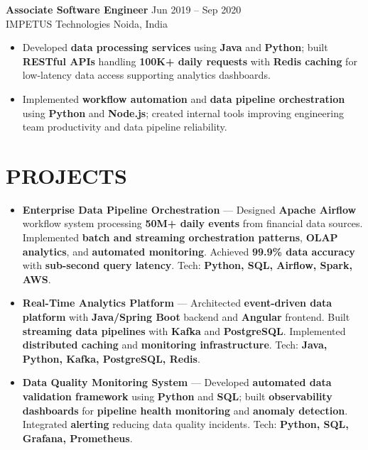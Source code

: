 \documentclass[letterpaper,10pt]{article}
\newcommand{\resumeItem}[1]{\item\small #1}
\newcommand{\resumeSubheading}[4]{
  \vspace{6pt}
  \noindent
  \textbf{#1} \hfill {\footnotesize #2} \\
  [-1pt]
  \noindent
  \small #3 \hfill {\small #4}
  \vspace{3pt}
}
\newcommand{\resumeItemsStart}{\vspace{-2pt}\begin{itemize}}
\newcommand{\resumeItemsEnd}{\end{itemize}\vspace{6pt}}
\begin{document}
\resumeSubheading
{Associate Software Engineer}{Jun 2019 -- Sep 2020}
{IMPETUS Technologies}{Noida, India}
\resumeItemsStart
\resumeItem{Developed \textbf{data processing services} using \textbf{Java} and \textbf{Python}; built \textbf{RESTful APIs} handling \textbf{100K+ daily requests} with \textbf{Redis caching} for low-latency data access supporting analytics dashboards.}
\resumeItem{Implemented \textbf{workflow automation} and \textbf{data pipeline orchestration} using \textbf{Python} and \textbf{Node.js}; created internal tools improving engineering team productivity and data pipeline reliability.}
\resumeItemsEnd
\vspace{-8pt}

\section{\textcolor{metablue}{PROJECTS}}
\vspace{-6pt}
\begin{tcolorbox}[colback=white,colframe=metablue,boxrule=0.8pt,arc=2pt,left=4pt,right=4pt,top=2pt,bottom=2pt,before skip=0pt,after skip=0pt]
\begin{itemize}[topsep=0pt,partopsep=0pt]
\resumeItem{\textbf{Enterprise Data Pipeline Orchestration} --- Designed \textbf{Apache Airflow} workflow system processing \textbf{50M+ daily events} from financial data sources. Implemented \textbf{batch and streaming orchestration patterns}, \textbf{OLAP analytics}, and \textbf{automated monitoring}. Achieved \textbf{99.9\% data accuracy} with \textbf{sub-second query latency}. Tech: \textbf{Python, SQL, Airflow, Spark, AWS}.}
\resumeItem{\textbf{Real-Time Analytics Platform} --- Architected \textbf{event-driven data platform} with \textbf{Java/Spring Boot} backend and \textbf{Angular} frontend. Built \textbf{streaming data pipelines} with \textbf{Kafka} and \textbf{PostgreSQL}. Implemented \textbf{distributed caching} and \textbf{monitoring infrastructure}. Tech: \textbf{Java, Python, Kafka, PostgreSQL, Redis}.}
\resumeItem{\textbf{Data Quality Monitoring System} --- Developed \textbf{automated data validation framework} using \textbf{Python} and \textbf{SQL}; built \textbf{observability dashboards} for \textbf{pipeline health monitoring} and \textbf{anomaly detection}. Integrated \textbf{alerting} reducing data quality incidents. Tech: \textbf{Python, SQL, Grafana, Prometheus}.}
\end{itemize}
\end{tcolorbox}
\vspace{-5pt}
\end{document}
